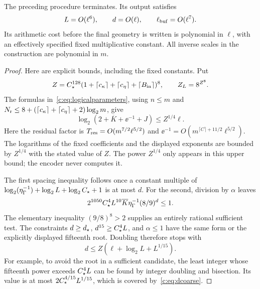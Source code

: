 \begin{lemma}
\label{c:lem:parameters}
The preceding procedure terminates. Its output satisfies
\begin{equation}
 L=O(\ell^6),\qquad d=O(\ell),\qquad \ell_{\rm buf}=O(\ell^7).
                                                               \label{c:eq:polylogscales}
\end{equation}
Its arithmetic cost before the final geometry is written is polynomial
in $\ell$, with an effectively specified fixed multiplicative constant.
All inverse scales in the construction are polynomial in $m$.
\end{lemma}
\begin{proof}
Here are explicit bounds, including the fixed constants. Put
\begin{equation}
 Z=C_\star^{128}(1+\lceil c_\kappa\rceil+\lceil c_\eta\rceil+
                         \lceil B_{\rm in}\rceil)^8,
 \qquad Z_L=8^{Z^8}.                                \label{c:eq:ZAL}
\end{equation}
The formulas in~\eqref{c:eq:logicalparameters}, using $n\le m$ and
$N_{\rm r}\le 8+(\lceil c_\kappa\rceil+\lceil c_\eta\rceil+2)\log_2m$, give
\[
 \log_2(2+\overline K+\ee^{-1}+J)\le Z^{1/4}\ell.
\]
Here the residual factor is
$T_{\rm res}=O(m^{7/2}\ell^{5/2})$ and
$\ee^{-1}=O(m^{\lceil C\rceil+11/2}\ell^{5/2})$.
The logarithms of the fixed coefficients and the displayed exponents are
bounded by $Z^{1/4}$ with the stated value of $Z$.
The power $Z^{1/4}$ only appears in this upper bound; the encoder never
computes it.

The first spacing inequality follows once a constant multiple of
$\log_2(\eta_\Gamma^{-1})+\log_2L+\log_2C_\star+1$ is at most $d$.
For the second, division by $\alpha$ leaves
\[
 2^{1050}C_\star^4 L^{10}\overline K\eta_\Gamma^{-1}(8/9)^d\le1.
\]
The elementary inequality $(9/8)^8>2$ supplies an entirely rational
sufficient test. The constraints $d\ge d_\star$, $d^{15}\ge C_\star^4L$,
and $\alpha\le1$ have the same form or the explicitly displayed
fifteenth root. Doubling therefore stops with
\begin{equation}
 d\le Z(\ell+\log_2L+L^{1/15}).                    \label{c:eq:dcoarse}
\end{equation}
For example, to avoid the root in a sufficient candidate, the least
integer whose fifteenth power exceeds $C_\star^4L$ can be found by
integer doubling and bisection. Its value is at most
$2C_\star^{4/15}L^{1/15}$, which is covered by~\eqref{c:eq:dcoarse}.


\end{proof}
